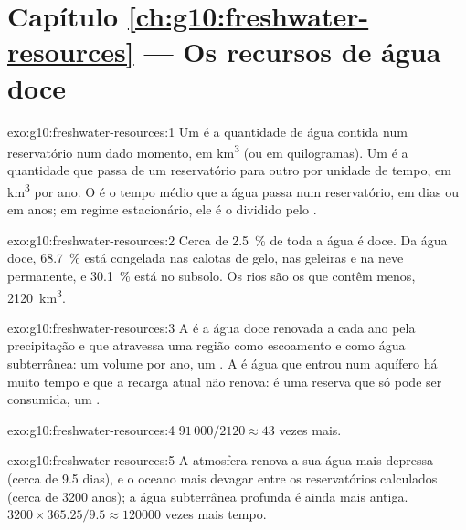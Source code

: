 \section*{Capítulo \ref{ch:g10:freshwater-resources} --- Os recursos de água doce}

\begin{solution}{exo:g10:freshwater-resources:1}
Um  é a quantidade de água contida num reservatório num dado
momento, em \unit{km^3} (ou em quilogramas). Um  é a quantidade que
passa de um reservatório para outro por unidade de tempo, em \unit{km^3} por
ano. O  é o tempo médio que a água passa num
reservatório, em dias ou em anos; em regime estacionário, ele é o 
dividido pelo .
\end{solution}

\begin{solution}{exo:g10:freshwater-resources:2}
Cerca de \qty{2.5}{\percent} de toda a água é doce. Da água doce,
\qty{68.7}{\percent} está congelada nas calotas de gelo, nas geleiras e na
neve permanente, e \qty{30.1}{\percent} está no subsolo. Os rios são os que
contêm menos, \num{2120}~\unit{km^3}.
\end{solution}

\begin{solution}{exo:g10:freshwater-resources:3}
A  é a água doce renovada a cada ano pela precipitação e
que atravessa uma região como escoamento e como água subterrânea: um volume
por ano, um . A  é água que entrou num aquífero
há muito tempo e que a recarga atual não renova: é uma reserva que só pode
ser consumida, um .
\end{solution}

\begin{solution}{exo:g10:freshwater-resources:4}
$91\,000/2120 \approx 43$ vezes mais.
\end{solution}

\begin{solution}{exo:g10:freshwater-resources:5}
A atmosfera renova a sua água mais depressa (cerca de \num{9.5} dias), e o
oceano mais devagar entre os reservatórios calculados (cerca de \num{3200}
anos); a água subterrânea profunda é ainda mais antiga.
$3200 \times 365.25/9.5 \approx \num{120000}$ vezes mais tempo.
\end{solution}

